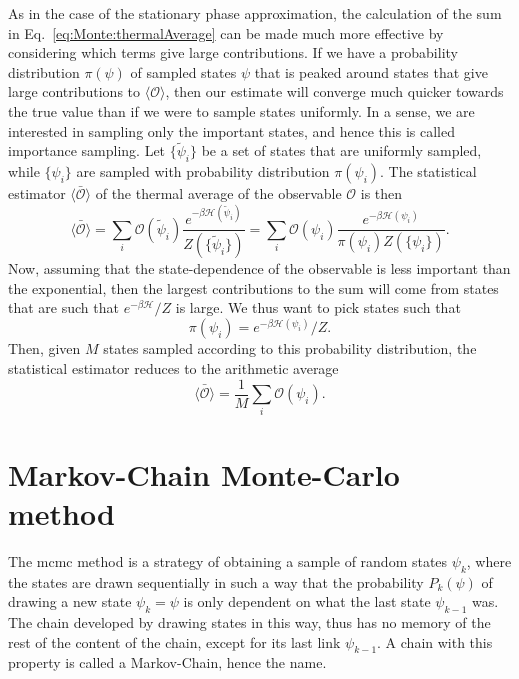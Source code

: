 As in the case of the stationary phase approximation, the calculation of the sum in Eq.~\eqref{eq:Monte:thermalAverage} can be made much more effective
by considering which terms give large contributions. If we have a probability distribution $\pi(\psi)$ of sampled states $\psi$ that is peaked around states
that give large contributions to $\langle\mathcal{O}\rangle$, then our estimate will converge much quicker towards the true value than if we were to
sample states uniformly. In a sense, we are interested in sampling only the important states, and hence this is called importance sampling. Let
$\{\tilde{\psi}_i\}$ be a set of states that are uniformly sampled, while $\{\psi_i\}$ are sampled with probability distribution $\pi(\psi_i)$. The
statistical estimator $\bar{\langle\mathcal{O}\rangle}$ of the thermal average of the observable $\mathcal{O}$ is then
\begin{equation}
    \label{eq:Monte:importanceSampledThermAvg}
    \bar{\langle\mathcal{O}\rangle} = \sum_{i}\mathcal{O}(\tilde{\psi}_i)\frac{e^{-\beta\mathcal{H}(\tilde{\psi}_i)}}{Z(\{\tilde{\psi}_i\})} = \sum_{i}\mathcal{O}(\psi_i)\frac{e^{-\beta\mathcal{H}(\psi_i)}}{\pi(\psi_i)Z(\{\psi_i\})}.
\end{equation}
Now, assuming that the state-dependence of the observable is less important than the exponential, then the largest contributions to the sum will
come from states that are such that $e^{-\beta\mathcal{H}}/Z$ is large. We thus want to pick states such that 
\begin{equation}
    \label{eq:Monte:boltzmannDist}
    \pi(\psi_i) = e^{-\beta\mathcal{H}(\psi_i)}/Z.
\end{equation}
Then, given $M$ states sampled according to this probability distribution, the statistical estimator reduces to the arithmetic average
\begin{equation}
    \label{eq:Monte:arithmTherm:Avg}
    \bar{\langle\mathcal{O}\rangle} = \frac{1}{M}\sum_i\mathcal{O}(\psi_i).
\end{equation}

\section{Markov-Chain Monte-Carlo method}

The \ac{mcmc} method is a strategy of obtaining a sample of random states $\psi_k$, where the states are drawn sequentially in such
a way that the probability $P_k(\psi)$ of drawing a new state $\psi_k=\psi$ is only dependent on what the last
state $\psi_{k-1}$ was. The chain developed by drawing states in this way, thus has no memory of the rest of the content
of the chain, except for its last link $\psi_{k-1}$. A chain with this property is called a Markov-Chain, hence the name.

